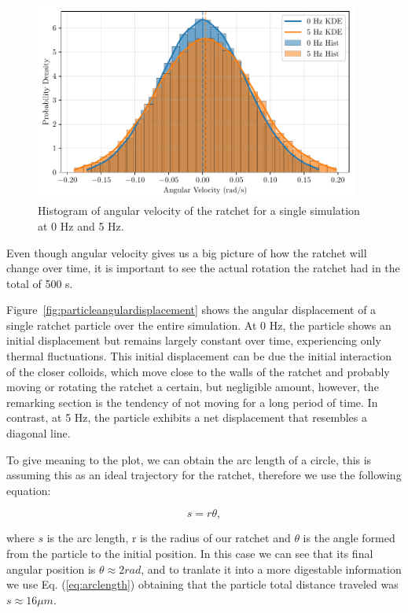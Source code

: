 \begin{figure}[h!]
  \begin{center}
    \includegraphics[width=0.95\textwidth]{figures/histogram.pdf}
  \end{center}
  \caption[Histogram of angular velocity.]{Histogram of angular velocity of the ratchet for a single simulation at 0 Hz and 5 Hz.}\label{fig:histogram}
\end{figure}

Even though angular velocity gives us a big picture of how the ratchet will change over time, it is important to see the actual rotation the ratchet had in the total of 500 s.

Figure~\ref{fig:particleangulardisplacement} shows the angular displacement of a single ratchet particle over the entire simulation. At 0 Hz, the particle shows an initial displacement but remains largely constant over time, experiencing only thermal fluctuations. This initial displacement can be due the initial interaction of the closer colloids, which move close to the walls of the ratchet and probably moving or rotating the ratchet a certain, but negligible amount, however, the remarking section is the tendency of not moving for a long period of time. In contrast, at 5 Hz, the particle exhibits a net displacement that resembles a diagonal line. 

To give meaning to the plot, we can obtain the arc length of a circle, this is assuming this as an ideal trajectory for the ratchet, therefore we use the following equation:

\begin{equation}
  s = r\theta,
  \label{eq:arclength}
\end{equation}

where $s$ is the arc length, r is the radius of our ratchet and $\theta$ is the angle formed from the particle to the initial position.
In this case we can see that its final angular position is $\theta \approx 2 rad$, and to tranlate it into a more digestable information we use Eq. (\ref{eq:arclength}) obtaining that the particle total distance traveled was $s \approx 16 \mu m$.

